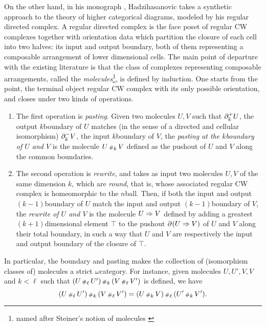 On the other hand, in his monograph \cite{hadzihasanovic2024combinatorics}, Hadzihasanovic takes a synthetic approach to the theory of higher categorical diagrams, modeled by his regular directed complex.
A regular directed complex is the face poset of regular CW complexes together with orientation data which partition the closure of each cell into two halves: its input and output boundary, both of them representing a composable arrangement of lower dimensional cells.
The main point of departure with the existing literature is that the class of complexes representing composable arrangements, called the \emph{molecules}\footnote{named after Steiner's notion of molecules \cite{steiner1993algebra}}, is defined by induction.
One starts from the point, the terminal object regular CW complex with its only possible orientation, and closes under two kinds of operations.
\begin{enumerate}
    \item The first operation is \emph{pasting}. Given two molecules \( U, V \) such that \( \partial_{k}^{+} U \), the output \( k \)\nbd boundary of \( U \) matches (in the sense of a directed and cellular isomorphism) \( \partial_{k}^{-} V \), the input \( k \)\nbd boundary of \( V \), the \emph{pasting at the \( k \)\nbd boundary of \( U \) and \( V \)} is the molecule \( U \,{\scriptstyle\#}_{k}\, V \) defined as the pushout of \( U \) and \( V \) along the common boundaries. 
    \item The second operation is \emph{rewrite}, and takes as input two molecules \( U, V \) of the same dimension \( k \), which are \emph{round}, that is, whose associated regular CW complex is homeomorphic to the \( n \)\nbd ball.
    Then, if both the input and output \( (k - 1) \)\nbd boundary of \( U \) match the input and output \( (k - 1) \)\nbd boundary of \( V \), the \emph{rewrite of \( U \) and \( V \)} is the molecule \( U \Rightarrow V \) defined by adding a greatest \( (k + 1) \)\nbd dimensional element \( \top \) to the pushout \( \partial_{}^{}(U \Rightarrow V) \) of \( U \) and \( V \) along their total boundary, in such a way that \( U \) and \( V \) are respectively the input and output boundary of the closure of \( \top \).
\end{enumerate}  
In particular, the boundary and pasting makes the collection of (isomorphism classes of) molecules a strict \( \omega \)\nbd category.
For instance, given molecules \( U, U', V, V \) and \( k < \ell \) such that \( (U \,{\scriptstyle\#}_{\ell}\, U') \,{\scriptstyle\#}_{k}\, (V \,{\scriptstyle\#}_{\ell}\, V') \) is defined, we have
\begin{equation*}
    (U \,{\scriptstyle\#}_{\ell}\, U') \,{\scriptstyle\#}_{k}\, (V \,{\scriptstyle\#}_{\ell}\, V') = (U \,{\scriptstyle\#}_{k}\, V) \,{\scriptstyle\#}_{\ell}\, (U' \,{\scriptstyle\#}_{k}\, V').
\end{equation*}
